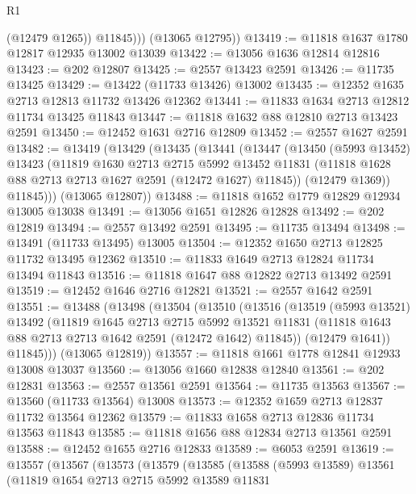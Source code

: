 \begin{lexlean}{R1}
\begin{coremodule}
              (@12479 @1265))
            @11845)))
      (@13065 @12795))
@13419 := @11818 @1637 @1780 @12817 @12935 @13002 @13039
@13422 := @13056 @1636 @12814 @12816
@13423 := @202 @12807
@13425 := @2557 @13423 @2591
@13426 := @11735 @13425
@13429 := @13422 (@11733 @13426) @13002
@13435 := @12352 @1635 @2713 @12813 @11732 @13426 @12362
@13441 := @11833 @1634 @2713 @12812 @11734 @13425 @11843
@13447 := @11818 @1632 @88 @12810 @2713 @13423 @2591
@13450 := @12452 @1631 @2716 @12809
@13452 := @2557 @1627 @2591
@13482 := @13419
    (@13429
      (@13435
        (@13441
          (@13447
            (@13450
              (@5993 @13452)
              @13423
              (@11819
                @1630
                @2713
                @2715
                @5992
                @13452
                @11831
                (@11818 @1628 @88 @2713 @2713 @1627 @2591 (@12472 @1627) @11845))
              (@12479 @1369))
            @11845)))
      (@13065 @12807))
@13488 := @11818 @1652 @1779 @12829 @12934 @13005 @13038
@13491 := @13056 @1651 @12826 @12828
@13492 := @202 @12819
@13494 := @2557 @13492 @2591
@13495 := @11735 @13494
@13498 := @13491 (@11733 @13495) @13005
@13504 := @12352 @1650 @2713 @12825 @11732 @13495 @12362
@13510 := @11833 @1649 @2713 @12824 @11734 @13494 @11843
@13516 := @11818 @1647 @88 @12822 @2713 @13492 @2591
@13519 := @12452 @1646 @2716 @12821
@13521 := @2557 @1642 @2591
@13551 := @13488
    (@13498
      (@13504
        (@13510
          (@13516
            (@13519
              (@5993 @13521)
              @13492
              (@11819
                @1645
                @2713
                @2715
                @5992
                @13521
                @11831
                (@11818 @1643 @88 @2713 @2713 @1642 @2591 (@12472 @1642) @11845))
              (@12479 @1641))
            @11845)))
      (@13065 @12819))
@13557 := @11818 @1661 @1778 @12841 @12933 @13008 @13037
@13560 := @13056 @1660 @12838 @12840
@13561 := @202 @12831
@13563 := @2557 @13561 @2591
@13564 := @11735 @13563
@13567 := @13560 (@11733 @13564) @13008
@13573 := @12352 @1659 @2713 @12837 @11732 @13564 @12362
@13579 := @11833 @1658 @2713 @12836 @11734 @13563 @11843
@13585 := @11818 @1656 @88 @12834 @2713 @13561 @2591
@13588 := @12452 @1655 @2716 @12833
@13589 := @6053 @2591
@13619 := @13557
    (@13567
      (@13573
        (@13579
          (@13585
            (@13588
              (@5993 @13589)
              @13561
              (@11819
                @1654
                @2713
                @2715
                @5992
                @13589
                @11831

\end{coremodule}
\end{lexlean}
